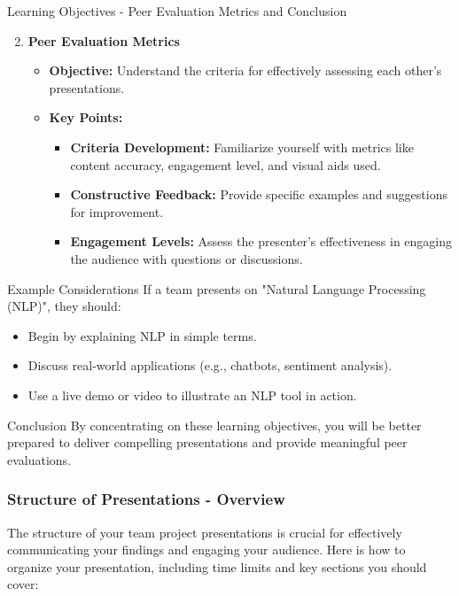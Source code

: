 \documentclass[aspectratio=169]{beamer}
\begin{document}
\begin{frame}[fragile]{Learning Objectives - Peer Evaluation Metrics and Conclusion}
    \begin{enumerate}
        \setcounter{enumi}{1} %
        \item \textbf{Peer Evaluation Metrics}
        \begin{itemize}
            \item \textbf{Objective:} Understand the criteria for effectively assessing each other’s presentations.
            \item \textbf{Key Points:}
            \begin{itemize}
                \item \textbf{Criteria Development:} Familiarize yourself with metrics like content accuracy, engagement level, and visual aids used.
                \item \textbf{Constructive Feedback:} Provide specific examples and suggestions for improvement.
                \item \textbf{Engagement Levels:} Assess the presenter's effectiveness in engaging the audience with questions or discussions.
            \end{itemize}
        \end{itemize}
    \end{enumerate}

    \begin{block}{Example Considerations}
        If a team presents on "Natural Language Processing (NLP)", they should:
        \begin{itemize}
            \item Begin by explaining NLP in simple terms.
            \item Discuss real-world applications (e.g., chatbots, sentiment analysis).
            \item Use a live demo or video to illustrate an NLP tool in action.
        \end{itemize}
    \end{block}

    \begin{block}{Conclusion}
        By concentrating on these learning objectives, you will be better prepared to deliver compelling presentations and provide meaningful peer evaluations.
    \end{block}
\end{frame}

\begin{frame}[fragile]
    \frametitle{Structure of Presentations - Overview}
    The structure of your team project presentations is crucial for effectively communicating your findings and engaging your audience. 
    Here is how to organize your presentation, including time limits and key sections you should cover:
\end{frame}
\end{document}
